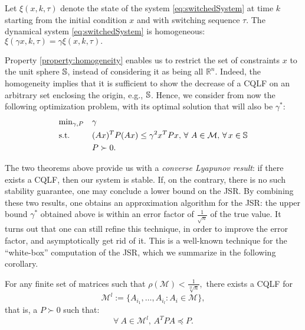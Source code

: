 
\begin{property}\label{property:homogeneity}
Let $\xi(x, k, \tau)$ denote the state of the system \eqref{eq:switchedSystem} at time $k$ starting from the initial condition $x$ and with switching sequence $\tau$. The dynamical system \eqref{eq:switchedSystem} is homogeneous: $\xi(\gamma x, k, \tau)= \gamma \xi(x, k, \tau).$
\end{property}

Property \ref{property:homogeneity} enables us to restrict the set of constraints $x$ to the unit sphere $\mathbb{S}$, instead of considering it as being all $\mathbb{R}^n$. Indeed, the homogeneity implies that it is sufficient to show the decrease of a CQLF on an arbitrary set enclosing the origin, e.g., $\mathbb{S}$. Hence, we consider from now the following optimization problem, with its optimal solution that will also be $\gamma^{*}$:
\begin{equation}\label{eqn:campiOpt1}
\begin{aligned}
& \text{min}_{\gamma, P} & & \gamma \\
& \text{s.t.} 
&  & (Ax)^TP(Ax) \leq \gamma^2 x^TPx,\,\forall\ A \in \mathcal{M}, \,\forall\, x \in \mathbb{S}\\
& && P \succ 0. \\
\end{aligned}
\end{equation}


The two theorems above provide us with a \emph{converse Lyapunov result}: if there exists a CQLF, then our system is stable. If, on the contrary, there is no such stability guarantee, one may conclude a lower bound on the JSR. By combining these two results, one obtains an approximation algorithm for the JSR: the upper bound $\gamma^*$ obtained above is within an error factor of $\frac{1}{\sqrt{n}}$ of the true value. It turns out that one can still refine this technique, in order to improve the error factor, and asymptotically get rid of it. This is a well-known technique for the ``white-box'' computation of the JSR, which we summarize in the following corollary.

\begin{cor}\label{cor:approx-products}
For any finite set of matrices such that $\rho(\mathcal{M}) < \frac{1}{\sqrt[2l]{n}},$ there exists a CQLF for $$\mathcal{M}^l:=\{A_{i_1},\dots, A_{i_{l}}: A_i \in \mathcal{M}\},$$ that is, a $P\succ 0$ such that: $$\forall\ A \in \mathcal{M}^l,\, A^T P A\preceq P. $$
\end{cor}


